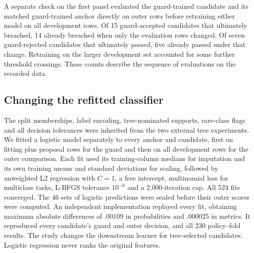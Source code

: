 A separate check on the first panel evaluated the guard-trained candidate and its matched guard-trained anchor directly on outer rows before retraining either model on all development rows. Of 15 guard-accepted candidates that ultimately breached, 14 already breached when only the evaluation rows changed. Of seven guard-rejected candidates that ultimately passed, five already passed under that change. Retraining on the larger development set accounted for some further threshold crossings. These counts describe the sequence of evaluations on the recorded data.

\subsection{Changing the refitted classifier}
\label{sec:receiver}
The split memberships, label encoding, tree-nominated supports, rare-class flags and all decision tolerances were inherited from the two external tree experiments. We fitted a logistic model separately to every anchor and candidate, first on fitting plus proposal rows for the guard and then on all development rows for the outer comparison. Each fit used its training-column medians for imputation and its own training means and standard deviations for scaling, followed by unweighted L2 regression with $C=1$, a free intercept, multinomial loss for multiclass tasks, L-BFGS tolerance $10^{-6}$ and a 2,000-iteration cap. All 524 fits converged. The 46 sets of logistic predictions were sealed before their outer scores were computed. An independent implementation replayed every fit, obtaining maximum absolute differences of .00109 in probabilities and .000025 in metrics. It reproduced every candidate's guard and outer decision, and all 230 policy--fold results. The study changes the downstream learner for tree-selected candidates. Logistic regression never ranks the original features.


